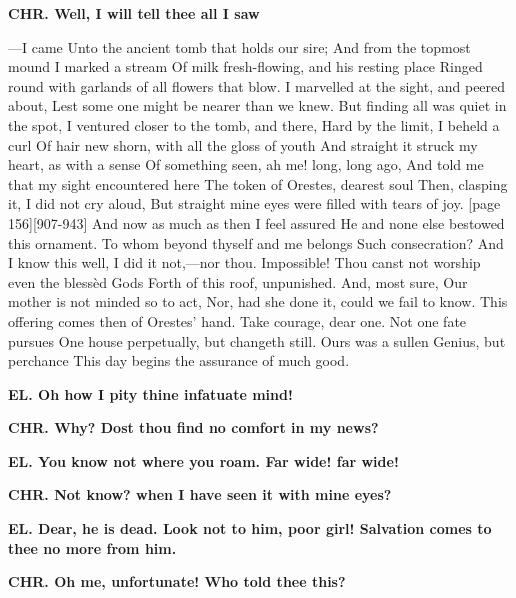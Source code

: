 \documentclass[11pt,letter]{book}
\begin{document}
\par \textbf{CHR. Well, I will tell thee all I saw}
\par  —I came Unto the ancient tomb that holds our sire; And from the topmost mound I marked a stream Of milk fresh-flowing, and his resting place Ringed round with garlands of all flowers that blow. I marvelled at the sight, and peered about, Lest some one might be nearer than we knew. But finding all was quiet in the spot, I ventured closer to the tomb, and there, Hard by the limit, I beheld a curl Of hair new shorn, with all the gloss of youth And straight it struck my heart, as with a sense Of something seen, ah me! long, long ago, And told me that my sight encountered here The token of Orestes, dearest soul Then, clasping it, I did not cry aloud, But straight mine eyes were filled with tears of joy. [page 156][907-943] And now as much as then I feel assured He and none else bestowed this ornament. To whom beyond thyself and me belongs Such consecration? And I know this well, I did it not,—nor thou. Impossible! Thou canst not worship even the blessèd Gods Forth of this roof, unpunished. And, most sure, Our mother is not minded so to act, Nor, had she done it, could we fail to know. This offering comes then of Orestes’ hand. Take courage, dear one. Not one fate pursues One house perpetually, but changeth still. Ours was a sullen Genius, but perchance This day begins the assurance of much good.

\par \textbf{EL. Oh how I pity thine infatuate mind!}
\par 

\par \textbf{CHR. Why? Dost thou find no comfort in my news?}
\par 

\par \textbf{EL. You know not where you roam. Far wide! far wide!}
\par 

\par \textbf{CHR. Not know? when I have seen it with mine eyes?}
\par 

\par \textbf{EL. Dear, he is dead. Look not to him, poor girl! Salvation comes to thee no more from him.}
\par 

\par \textbf{CHR. Oh me, unfortunate! Who told thee this?}
\par 
\end{document}

